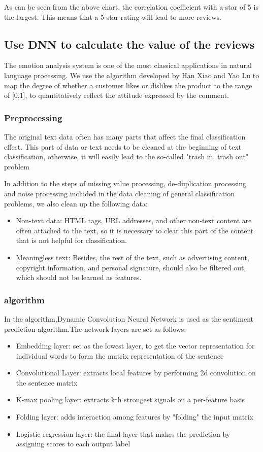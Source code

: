 \documentclass{mcmthesis}
\begin{document}
As can be seen from the above chart, the correlation coefficient with a star of 5 is the largest. This means that a 5-star rating will lead to more reviews.

\subsection{Use DNN to calculate the value of the reviews}
The emotion analysis system is one of the most classical applications in natural language processing. We use the algorithm developed by Han Xiao and Yao Lu to map the degree of whether a customer likes or dislikes the product to the range of [0,1], to quantitatively reflect the attitude expressed by the comment.
\subsubsection{Preprocessing}


The original text data often has many parts that affect the final classification effect. This part of data or text needs to be cleaned at the beginning of text classification, otherwise, it will easily lead to the so-called "trash in, trash out" problem

In addition to the steps of missing value processing, de-duplication processing and noise processing included in the data cleaning of general classification problems, we also clean up the following data:
\begin{itemize}
	\item Non-text data: HTML tags, URL addresses, and other non-text content are often attached to the text, so it is necessary to clear this part of the content that is not helpful for classification.
	\item Meaningless text: Besides, the rest of the text, such as advertising content, copyright information, and personal signature, should also be filtered out, which should not be learned as features.
\end{itemize}
\subsubsection{algorithm}
In the algorithm,Dynamic Convolution Neural Network is used as the sentiment prediction algorithm.The network layers are set as follows:
\begin{itemize}
	\item Embedding layer: set as the lowest layer, to get the vector representation for individual words to form the matrix representation of the sentence
	\item Convolutional Layer: extracts local features by performing 2d convolution on the sentence matrix
	\item K-max pooling layer: extracts kth strongest signals on a per-feature basis
	\item Folding layer: adds interaction among features by "folding" the input matrix
	\item Logistic regression layer: the final layer that makes the prediction by assigning scores to each output label
\end{itemize}
\end{document}
